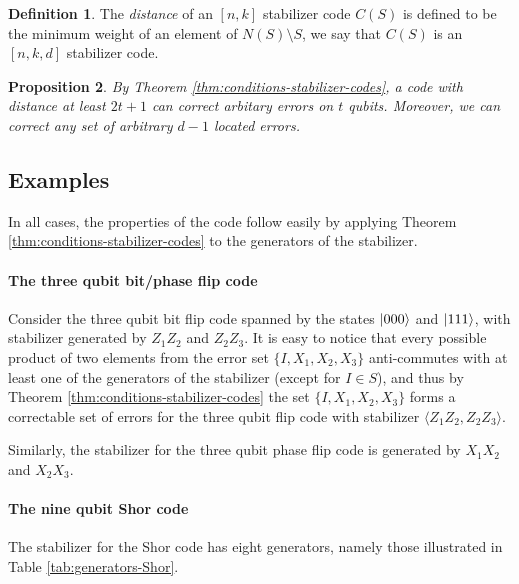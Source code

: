 \documentclass[11pt,a4paper]{article}
\theoremstyle{definition}
\newtheorem{definition}{Definition}[section]
\theoremstyle{plain}
\newtheorem{proposition}[definition]{Proposition}
\theoremstyle{remark}
\begin{document}
\begin{definition}
  The \emph{distance} of an $[n,k]$ stabilizer code $C(S)$ is defined to be the minimum weight of an element of 
  $N(S) \setminus S$, we say that $C(S)$ is an $[n,k,d]$ stabilizer code.   
\end{definition}

\begin{proposition}
  By Theorem \ref{thm:conditions-stabilizer-codes}, a code with distance at least $2t + 1$ can correct arbitary 
  errors on $t$ qubits. Moreover, we can correct any set of arbitrary $d-1$ located errors. 
\end{proposition}

\subsection{Examples} 
In all cases, the properties of the code follow easily by applying Theorem \ref{thm:conditions-stabilizer-codes} to the 
generators of the stabilizer. 

\paragraph{The three qubit bit/phase flip code}
Consider the three qubit bit flip code spanned by the states 
$\ket{000}$ and $\ket{111}$, with stabilizer generated by $Z_1 Z_2$ and $Z_2 Z_3$. 
It is easy to notice that every possible product of two elements from the error set $\{I, X_1, X_2, X_3\}$ 
anti-commutes with at least one of the generators of the stabilizer (except for $I \in S$), 
and thus by Theorem \ref{thm:conditions-stabilizer-codes} the set $\{I, X_1, X_2, X_3\}$ forms a correctable set of 
errors for the three qubit flip code with stabilizer $\langle Z_1 Z_2, Z_2 Z_3\rangle$. 

Similarly, the stabilizer for the three qubit phase flip code is generated by $X_1 X_2$ and $X_2 X_3$. 

\paragraph{The nine qubit Shor code} 
The stabilizer for the Shor code has eight generators, namely those illustrated in Table \ref{tab:generators-Shor}.
\end{document}

